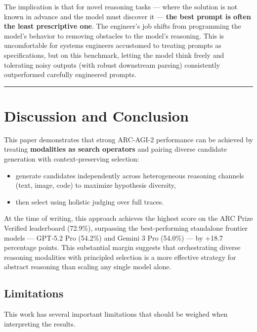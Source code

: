 \documentclass[11pt]{article}
\providecommand{\tightlist}{%
  \setlength{\itemsep}{0pt}\setlength{\parskip}{0pt}}
\begin{document}
The implication is that for novel reasoning tasks --- where the solution
is not known in advance and the model must discover it --- \textbf{the
best prompt is often the least prescriptive one}. The engineer's job
shifts from programming the model's behavior to removing obstacles to
the model's reasoning. This is uncomfortable for systems engineers
accustomed to treating prompts as specifications, but on this benchmark,
letting the model think freely and tolerating noisy outputs (with robust
downstream parsing) consistently outperformed carefully engineered
prompts.

\begin{center}\rule{0.5\linewidth}{0.5pt}\end{center}

\hypertarget{discussion-and-conclusion}{%
\section{Discussion and Conclusion}\label{discussion-and-conclusion}}

This paper demonstrates that strong ARC-AGI-2 performance can be
achieved by treating \textbf{modalities as search operators} and pairing
diverse candidate generation with context-preserving selection:

\begin{itemize}
\tightlist
\item
  generate candidates independently across heterogeneous reasoning
  channels (text, image, code) to maximize hypothesis diversity,
\item
  then select using holistic judging over full traces.
\end{itemize}

At the time of writing, this approach achieves the highest score on the
ARC Prize Verified leaderboard (72.9\%), surpassing the best-performing
standalone frontier models --- GPT-5.2 Pro (54.2\%) and Gemini 3 Pro
(54.0\%) --- by +18.7 percentage points. This substantial margin
suggests that orchestrating diverse reasoning modalities with principled
selection is a more effective strategy for abstract reasoning than
scaling any single model alone.

\hypertarget{limitations}{%
\subsection{Limitations}\label{limitations}}

This work has several important limitations that should be weighed when
interpreting the results.
\end{document}
